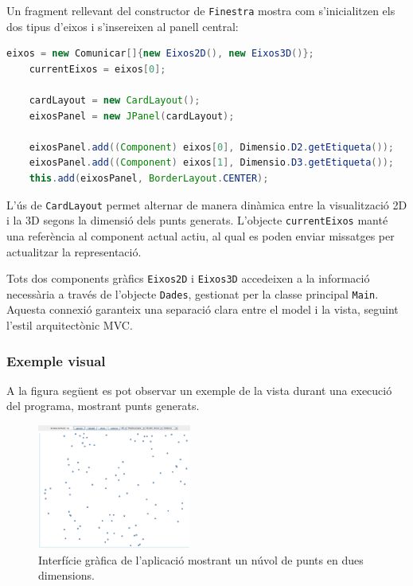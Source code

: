 \documentclass{ieeetj}
\begin{document}
Un fragment rellevant del constructor de \texttt{Finestra} mostra com s'inicialitzen els dos tipus d'eixos i s'insereixen al panell central:

\begin{itemize}
    \begin{lstlisting}[language=java]
    eixos = new Comunicar[]{new Eixos2D(), new Eixos3D()};
    currentEixos = eixos[0];
    
    cardLayout = new CardLayout();
    eixosPanel = new JPanel(cardLayout);
    
    eixosPanel.add((Component) eixos[0], Dimensio.D2.getEtiqueta());
    eixosPanel.add((Component) eixos[1], Dimensio.D3.getEtiqueta());
    this.add(eixosPanel, BorderLayout.CENTER);
    \end{lstlisting}
    
\end{itemize}


L'ús de \texttt{CardLayout} permet alternar de manera dinàmica entre la visualització 2D i la 3D segons la dimensió dels punts generats. L'objecte \texttt{currentEixos} manté una referència al component actual actiu, al qual es poden enviar missatges per actualitzar la representació.

Tots dos components gràfics \texttt{Eixos2D} i \texttt{Eixos3D} accedeixen a la informació necessària a través de l'objecte \texttt{Dades}, gestionat per la classe principal \texttt{Main}. Aquesta connexió garanteix una separació clara entre el model i la vista, seguint l'estil arquitectònic MVC.

\subsubsection*{Exemple visual}

A la figura següent es pot observar un exemple de la vista durant una execució del programa, mostrant punts generats.

\begin{figure}[htbp]
    \centerline{\includegraphics[width=0.45\textwidth]{docs/png/exempleVista.jpg}}
    \caption{Interfície gràfica de l'aplicació mostrant un núvol de punts en dues dimensions.}
    \label{fig:nuvol2D}
\end{figure}
\end{document}
